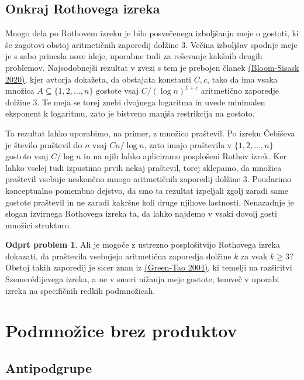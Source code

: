 \documentclass[11pt]{book}
\theoremstyle{definition}
\theoremstyle{zgled}
\theoremstyle{odprtproblem}
\newtheorem*{odprtproblem}{Odprt problem}
\theoremstyle{domacanaloga}
\theoremstyle{izrek}
\begin{document}
\subsection{Onkraj Rothovega izreka}

Mnogo dela po Rothovem izreku je bilo posvečenega izboljšanju meje o gostoti, ki še zagotovi obstoj aritmetičnih zaporedij dolžine $3$. Večina izboljšav spodnje meje je s sabo prinesla nove ideje, uporabne tudi za reševanje kakšnih drugih problemov. Najsodobnejši rezultat v zvezi s tem je prebojen članek \href{https://www.quantamagazine.org/landmark-math-proof-clears-hurdle-in-top-erdos-conjecture-20200803/}{(Bloom-Sisask 2020)}, kjer avtorja dokažeta, da obstajata konstanti $C,c$, tako da ima vsaka množica $A \subseteq \{ 1, 2, \dots, n \}$ gostote vsaj $C / (\log n)^{1 + c}$ aritmetično zaporedje dolžine $3$. Te meja se torej znebi dvojnega logaritma in uvede minimalen eksponent k logaritmu, zato je bistveno manjša restrikcija na gostoto. 

Ta rezultat lahko uporabimo, na primer, z množico praštevil. Po izreku Čebiševa je število praštevil do $n$ vsaj $C n / \log n$, zato imajo praštevila v $\{1,2,\dots,n\}$ gostoto vsaj $C / \log n$ in na njih lahko apliciramo posplošeni Rothov izrek. Ker lahko vselej tudi izpustimo prvih nekaj praštevil, torej sklepamo, da množica praštevil vsebuje neskončno mnogo aritmetičnih zaporedij dolžine $3$. Poudarimo konceptualno pomembno dejstvo, da smo ta rezultat izpeljali zgolj zaradi same gostote praštevil in ne zaradi kakršne koli druge njihove lastnosti. Nenazadnje je slogan izvirnega Rothovega izreka ta, da lahko najdemo v vsaki dovolj gosti množici strukturo.

\begin{odprtproblem}
Ali je mogoče z ustrezno posplošitvijo Rothovega izreka dokazati, da praštevila vsebujejo aritmetična zaporedja dolžine $k$ za vsak $k \geq 3$? Obstoj takih zaporedij je sicer znan iz \href{https://en.wikipedia.org/wiki/Green–Tao_theorem}{(Green-Tao 2004)}, ki temelji na razširitvi Szemerédijevega izreka, a ne v smeri nižanja meje gostote, temveč v uporabi izreka na specifičnih redkih podmnožicah.
\end{odprtproblem}

\section{Podmnožice brez produktov}

\subsection{Antipodgrupe}
\end{document}
